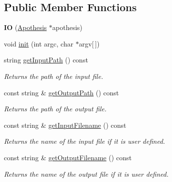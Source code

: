 \subsection*{Public Member Functions}
\begin{DoxyCompactItemize}
\item 
\mbox{\label{classIO_a6f367b73267c77dc282c26fd55db1fa6}} 
{\bfseries IO} (\mbox{\hyperlink{classApothesis}{Apothesis}} $\ast$apothesis)
\item 
void \mbox{\hyperlink{classIO_a502bfdc83c767e8ae0861db0aa8a02d2}{init}} (int argc, char $\ast$argv\mbox{[}$\,$\mbox{]})
\item 
\mbox{\label{classIO_ac6a72db3d529f2af860b91816b67174f}} 
string \mbox{\hyperlink{classIO_ac6a72db3d529f2af860b91816b67174f}{get\+Input\+Path}} () const
\begin{DoxyCompactList}\small\item\em Returns the path of the input file. \end{DoxyCompactList}\item 
\mbox{\label{classIO_ad10a2a8b673fe7ffaa343e6c4fbcd6ce}} 
const string \& \mbox{\hyperlink{classIO_ad10a2a8b673fe7ffaa343e6c4fbcd6ce}{get\+Output\+Path}} () const
\begin{DoxyCompactList}\small\item\em Returns the path of the output file. \end{DoxyCompactList}\item 
\mbox{\label{classIO_a6ef2ba4201c95276f8787515f5821806}} 
const string \& \mbox{\hyperlink{classIO_a6ef2ba4201c95276f8787515f5821806}{get\+Input\+Filename}} () const
\begin{DoxyCompactList}\small\item\em Returns the name of the input file if it is user defined. \end{DoxyCompactList}\item 
\mbox{\label{classIO_a51821af4035e8381548ba53a2e7ae3fa}} 
const string \& \mbox{\hyperlink{classIO_a51821af4035e8381548ba53a2e7ae3fa}{get\+Output\+Filename}} () const
\begin{DoxyCompactList}\small\item\em Returns the name of the output file if it is user defined. \end{DoxyCompactList}\item 

\end{DoxyCompactItemize}
